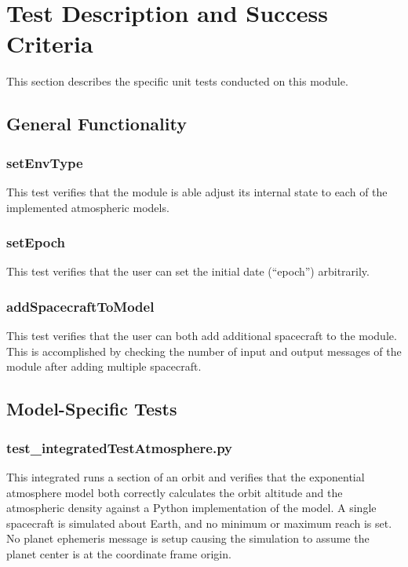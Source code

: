 
\section{Test Description and Success Criteria}
This section describes the specific unit tests conducted on this module.

\subsection{General Functionality}
\subsubsection{setEnvType}

This test verifies that the module is able adjust its internal state to each of the implemented atmospheric models.

\subsubsection{setEpoch}

This test verifies that the user can set the initial date (``epoch'') arbitrarily.

\subsubsection{addSpacecraftToModel}

This test verifies that the user can both add additional spacecraft to the module. This is accomplished by checking the number of input and output messages of the module after adding multiple spacecraft.

\subsection{Model-Specific Tests}

\subsubsection{test\_integratedTestAtmosphere.py}
This integrated runs a section of an orbit and verifies that the exponential atmosphere model both correctly calculates the orbit altitude and the atmospheric density against a Python implementation of the model.   A single spacecraft is simulated about Earth, and no minimum or maximum reach is set.  No planet ephemeris message is setup causing the simulation to assume the planet center is at the coordinate frame origin.

